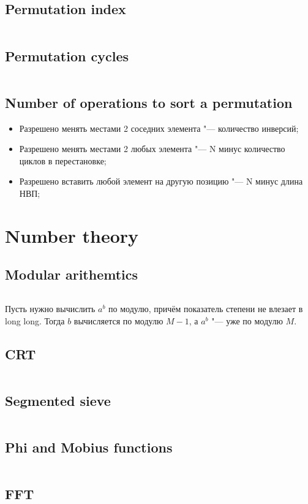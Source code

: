 ﻿\documentclass[10pt,twocolumn,oneside]{article}
\begin{document}
\subsection{Permutation index}
\inputminted[breaklines]{python}{Permutations/permutation number.py}
\subsection{Permutation cycles}
\inputminted[breaklines]{go}{Permutations/permutation cycles.go}
\subsection{Number of operations to sort a permutation}
\begin{itemize}
\item Разрешено менять местами 2 соседних элемента "--- количество инверсий;
\item Разрешено менять местами 2 любых элемента "--- N минус количество циклов в перестановке;
\item Разрешено вставить любой элемент на другую позицию "--- N минус длина НВП;
\end{itemize}

\section{Number theory}
\subsection{Modular arithemtics}
\inputminted[breaklines]{cpp}{Number theory/exgcd.cpp}
Пусть нужно вычислить $a^b$ по модулю, причём показатель степени не влезает в long long. Тогда $b$ вычисляется по модулю $M - 1$, а $a^b$ "--- уже по модулю $M$.
\subsection{CRT}
\inputminted[breaklines]{python}{Number theory/crt.py}
\subsection{Segmented sieve}
\inputminted[breaklines]{cpp}{Number theory/segmented sieve.cpp}
\subsection{Phi and Mobius functions}
\inputminted[breaklines]{cpp}{Number theory/mobius.cpp}
\subsection{FFT}
\inputminted[breaklines]{cpp}{Number theory/fft.cpp}
\end{document}
